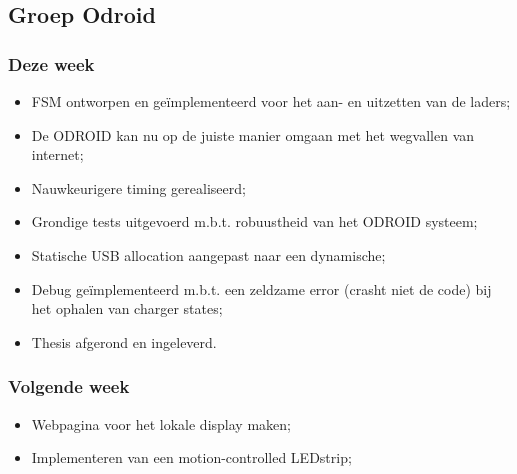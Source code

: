 \subsection*{Groep Odroid}
\subsubsection*{Deze week}

\begin{itemize}
\item FSM ontworpen en ge\"implementeerd voor het aan- en uitzetten van de laders;
\item De ODROID kan nu op de juiste manier omgaan met het wegvallen van internet;
\item Nauwkeurigere timing gerealiseerd;
\item Grondige tests uitgevoerd m.b.t. robuustheid van het ODROID systeem;
\item Statische USB allocation aangepast naar een dynamische;
\item Debug ge\"implementeerd m.b.t. een zeldzame error (crasht niet de code) bij het ophalen van charger states;
\item Thesis afgerond en ingeleverd.
\end{itemize}

\subsubsection*{Volgende week}
\begin{itemize}
\item Webpagina voor het lokale display maken;
\item Implementeren van een motion-controlled LEDstrip;
\end{itemize}